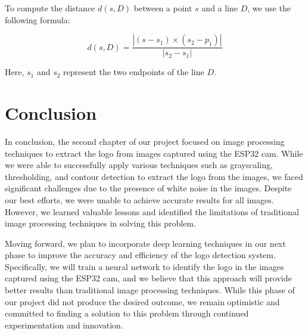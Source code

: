 To compute the distance $d(s, D)$ between a point $s$ and a line $D$, we use the following formula:

\begin{equation*}
    d(s, D) = \frac{|(s - s_1) \times (s_2 - p_1)|}{|s_2 - s_1|}
\end{equation*}

Here, $s_1$ and $s_2$ represent the two endpoints of the line $D$.
\vspace{1em}


\section{Conclusion}
In conclusion, the second chapter of our project focused on image processing techniques to extract the logo from images captured using the ESP32 cam. While we were able to successfully apply various techniques such as grayscaling, thresholding, and contour detection to extract the logo from the images, we faced significant challenges due to the presence of white noise in the images. Despite our best efforts, we were unable to achieve accurate results for all images. However, we learned valuable lessons and identified the limitations of traditional image processing techniques in solving this problem.

Moving forward, we plan to incorporate deep learning techniques in our next phase to improve the accuracy and efficiency of the logo detection system. Specifically, we will train a neural network to identify the logo in the images captured using the ESP32 cam, and we believe that this approach will provide better results than traditional image processing techniques. While this phase of our project did not produce the desired outcome, we remain optimistic and committed to finding a solution to this problem through continued experimentation and innovation.
\newpage

%



%